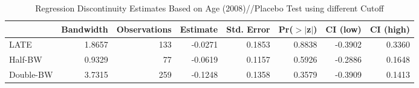 \begin{table}[ht]
\centering
\begin{tabular}{lrrrrrrr}
  \hline
 & Bandwidth & Observations & Estimate & Std. Error & Pr($>$$|$z$|$) & CI (low) & CI (high) \\ 
  \hline
LATE & 1.8657 & 133 & -0.0271 & 0.1853 & 0.8838 & -0.3902 & 0.3360 \\ 
  Half-BW & 0.9329 & 77 & -0.0619 & 0.1157 & 0.5926 & -0.2886 & 0.1648 \\ 
  Double-BW & 3.7315 & 259 & -0.1248 & 0.1358 & 0.3579 & -0.3909 & 0.1413 \\ 
   \hline
\end{tabular}
\caption{Regression Discontinuity Estimates Based on Age (2008)//Placebo Test using different Cutoff} 
\label{tab:rd2008y_plac}
\end{table}
